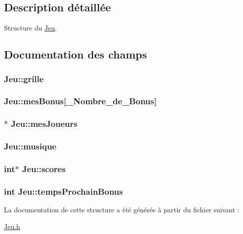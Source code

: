 \subsection{Description détaillée}
Structure du \hyperlink{structJeu}{Jeu}. 

\subsection{Documentation des champs}
\hypertarget{structJeu_a004d8d0f888b9dea26cbbc2d6afea6e7}{
\subsubsection[{grille}]{ Jeu\-::grille}}\label{structJeu_a004d8d0f888b9dea26cbbc2d6afea6e7}
\hypertarget{structJeu_a70bf0e19753aaa6cfba719388aae410d}{
\subsubsection[{mes\-Bonus}]{ Jeu\-::mes\-Bonus\mbox{[}{\bf \-\_\-\-Nombre\-\_\-de\-\_\-\-Bonus}\mbox{]}}}\label{structJeu_a70bf0e19753aaa6cfba719388aae410d}
\hypertarget{structJeu_aafbe63ae87dd9d9b17e69ae94123ee31}{
\subsubsection[{mes\-Joueurs}]{$\ast$ Jeu\-::mes\-Joueurs}}\label{structJeu_aafbe63ae87dd9d9b17e69ae94123ee31}
\hypertarget{structJeu_a254bcdad7f9995cb345b777980ffdbe0}{
\subsubsection[{musique}]{ Jeu\-::musique}}\label{structJeu_a254bcdad7f9995cb345b777980ffdbe0}
\hypertarget{structJeu_a3db4303dcbb7630f11d5bfdf4a7bf181}{
\subsubsection[{scores}]{\setlength{\rightskip}{0pt plus 5cm}int$\ast$ Jeu\-::scores}}\label{structJeu_a3db4303dcbb7630f11d5bfdf4a7bf181}
\hypertarget{structJeu_a08a8620c89aa61ed6bbeb2dcf6c68a40}{
\subsubsection[{temps\-Prochain\-Bonus}]{\setlength{\rightskip}{0pt plus 5cm}int Jeu\-::temps\-Prochain\-Bonus}}\label{structJeu_a08a8620c89aa61ed6bbeb2dcf6c68a40}


La documentation de cette structure a été générée à partir du fichier suivant \-:\begin{DoxyCompactItemize}
\item 
\hyperlink{Jeu_8h}{Jeu.\-h}\end{DoxyCompactItemize}
